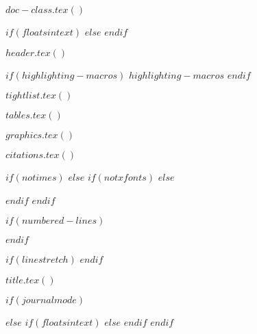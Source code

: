 $doc-class.tex()$

\RequirePackage{longtable}
\RequirePackage{threeparttablex}

% 
$if(floatsintext)$
$else$
$endif$





$header.tex()$

$if(highlighting-macros)$
$highlighting-macros$
$endif$

$tightlist.tex()$

$tables.tex()$

$graphics.tex()$

$citations.tex()$
  

$if(notimes)$
$else$
$if(notxfonts)$
    $else$
\usepackage{times}
    $endif$
$endif$

$if(numbered-lines)$
\usepackage{lineno}
$endif$

$if(linestretch)$
$endif$

$title.tex()$

$if(journalmode)$
\usepackage{float}
\makeatletter
\let\oldtpt\ThreePartTable
\let\endoldtpt\endThreePartTable
\def\ThreePartTable{\@ifnextchar[\ThreePartTable@i \ThreePartTable@ii}
\def\ThreePartTable@i[#1]{\begin{figure}
\onecolumn
\begin{minipage}{0.5\textwidth}
\oldtpt[#1]
}
\def\ThreePartTable@ii{\begin{figure}
\onecolumn
\begin{minipage}{0.5\textwidth}
\oldtpt
}
\def\endThreePartTable{
\endoldtpt
\end{minipage}
\twocolumn
\end{figure}}
\makeatother


\makeatletter
\let\endoldlt\endlongtable		
\def\endlongtable{
\hline
\endoldlt}
\makeatother
$else$
\makeatletter
\let\endoldlt\endlongtable
\def\endlongtable{
\hline
\endoldlt
}
\makeatother
$if(floatsintext)$
$else$
\RequirePackage{longtable}
$endif$
$endif$




